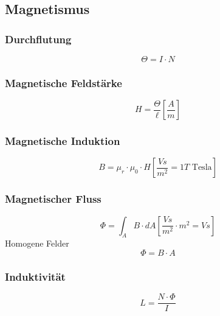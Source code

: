 



\subsection{Magnetismus}

\subsubsection{Durchflutung}
\[ \Theta = I \cdot N \]

\subsubsection{Magnetische Feldstärke}
\[ H = \frac{\Theta}{\ell} \left[\frac{A}{m}\right] \]

\subsubsection{Magnetische Induktion}
\[ B = \mu_r \cdot \mu_0 \cdot H \left[\frac{Vs}{m^2} = 1T \text{ Tesla}\right] \]

\subsubsection{Magnetischer Fluss}
\[ \Phi = \int_A B \cdot dA \left[\frac{Vs}{m^2} \cdot m^2 = Vs\right] \]
Homogene Felder
\[ \Phi = B \cdot A \]

\subsubsection{Induktivität}
\[ L = \frac{N \cdot \Phi}{I} \]

